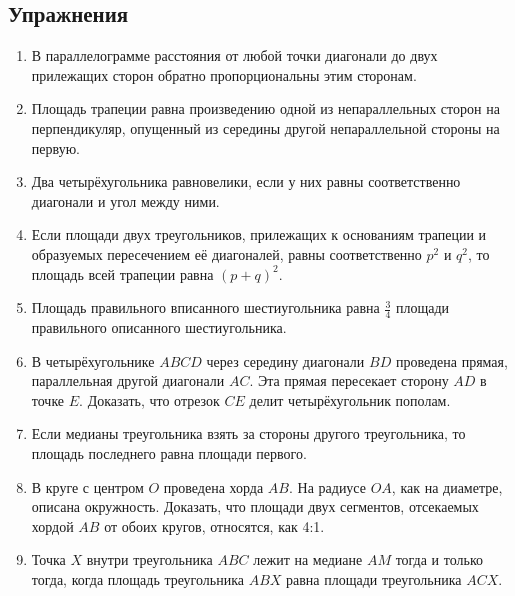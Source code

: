 \subsection*{Упражнения}

\begin{center}
\end{center}

\begin{enumerate}
\item
В параллелограмме расстояния от любой точки диагонали до двух прилежащих сторон обратно пропорциональны этим сторонам.

\item
Площадь трапеции равна произведению одной из непараллельных сторон на перпендикуляр, опущенный из середины другой непараллельной стороны на первую.

\item
Два четырёхугольника равновелики, если у них равны соответственно диагонали и угол между ними.

\item
Если площади двух треугольников, прилежащих к основаниям трапеции и образуемых пересечением её диагоналей, равны соответственно $p^2$ и $q^2$, то площадь всей трапеции равна $(p+q)^2$.

\item
Площадь правильного вписанного шестиугольника равна $\tfrac34$ площади правильного описанного шестиугольника.

\item
В четырёхугольнике $ABCD$ через середину диагонали $BD$ проведена прямая, параллельная другой диагонали $AC$.
Эта прямая пересекает сторону $AD$ в точке $E$.
Доказать, что отрезок $CE$ делит четырёхугольник пополам.

\item
Если медианы треугольника взять за стороны другого треугольника, то площадь последнего равна площади первого.

\item
В круге с центром $O$ проведена хорда $AB$.
На радиусе $OA$, как на диаметре, описана окружность.
Доказать, что площади двух сегментов, отсекаемых хордой $AB$ от обоих кругов, относятся, как 4:1.

\item Точка $X$ внутри треугольника $ABC$ лежит на медиане $AM$ тогда и только тогда, когда площадь треугольника $ABX$ равна площади треугольника $ACX$.

\end{enumerate}

